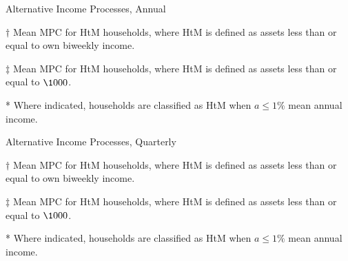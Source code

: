 \documentclass[9pt]{extarticle}
\begin{document}
\begin{table}[h]
\caption{Alternative Income Processes, Annual}
\begin{threeparttable}
\centering


\begin{tablenotes}
	\item[$\dagger$] Mean MPC for HtM households, where HtM is defined as assets less than or equal to own biweekly income.
	\item[$\ddagger$] Mean MPC for HtM households, where HtM is defined as assets less than or equal to $\1000$.
	\item[*] Where indicated, households are classified as HtM when $a \leq 1\%$ mean annual income.
\end{tablenotes}
\end{threeparttable}
\end{table}

\begin{table}[h]
\caption{Alternative Income Processes, Quarterly}
\begin{threeparttable}
\centering


\begin{tablenotes}
	\item[$\dagger$] Mean MPC for HtM households, where HtM is defined as assets less than or equal to own biweekly income.
	\item[$\ddagger$] Mean MPC for HtM households, where HtM is defined as assets less than or equal to $\1000$.
	\item[*] Where indicated, households are classified as HtM when $a \leq 1\%$ mean annual income.
\end{tablenotes}
\end{threeparttable}
\end{table}
\end{document}
